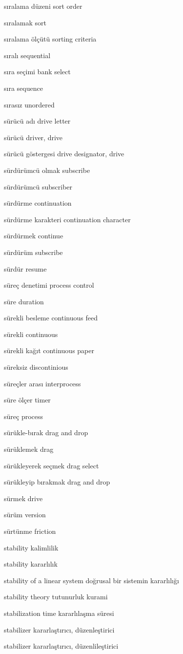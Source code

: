 \documentclass[12pt,fleqn]{article}\usepackage{../../common}
\begin{document}
sıralama düzeni sort order

sıralamak sort

sıralama ölçütü sorting criteria

sıralı sequential

sıra seçimi bank select

sıra sequence

sırasız unordered

sürücü adı drive letter

sürücü driver, drive

sürücü göstergesi drive designator, drive

sürdürümcü olmak subscribe

sürdürümcü subscriber

sürdürme continuation

sürdürme karakteri continuation character

sürdürmek continue

sürdürüm subscribe

sürdür resume

süreç denetimi process control

süre duration

sürekli besleme continuous feed

sürekli continuous

sürekli kağıt continuous paper

süreksiz discontinious

süreçler arası interprocess

süre ölçer timer

süreç process

sürükle-bırak drag and drop

sürüklemek drag

sürükleyerek seçmek drag select

sürükleyip bırakmak drag and drop

sürmek drive

sürüm version

sürtünme friction

stability kalimlilik

stability kararlılık

stability of a linear system doğrusal bir sistemin kararlılığı

stability theory tutunurluk kurami

stabilization time kararlılaşma süresi

stabilizer kararlaştırıcı, düzenleştirici

stabilizer kararlaştırıcı, düzenlileştirici
\end{document}
